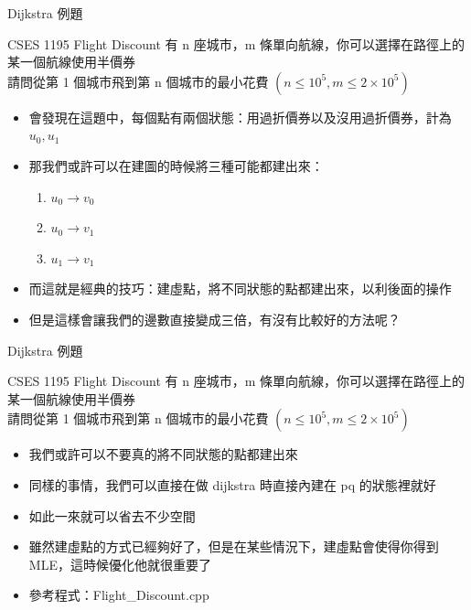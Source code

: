 \documentclass[aspectratio=169]{beamer}
\begin{document}
    \begin{frame}{Dijkstra 例題}
        \begin{block}{CSES 1195 Flight Discount}
            有 n 座城市，m 條單向航線，你可以選擇在路徑上的某一個航線使用半價券\\
            請問從第 1 個城市飛到第 n 個城市的最小花費 $(n \le 10^5, m \le 2 \times 10^5)$
        \end{block}

        \begin{itemize}
            \item<2-> 會發現在這題中，每個點有兩個狀態：用過折價券以及沒用過折價券，計為 $u_0, u_1$
            \item<3-> 那我們或許可以在建圖的時候將三種可能都建出來：
            \begin{enumerate}
                \item $u_0 \rightarrow v_0$
                \item $u_0 \rightarrow v_1$
                \item $u_1 \rightarrow v_1$
            \end{enumerate}
            \item<4-> 而這就是經典的技巧：建虛點，將不同狀態的點都建出來，以利後面的操作
            \item<5-> 但是這樣會讓我們的邊數直接變成三倍，有沒有比較好的方法呢？    
        \end{itemize}                   
    \end{frame}

    \begin{frame}{Dijkstra 例題}
        \begin{block}{CSES 1195 Flight Discount}
            有 n 座城市，m 條單向航線，你可以選擇在路徑上的某一個航線使用半價券\\
            請問從第 1 個城市飛到第 n 個城市的最小花費 $(n \le 10^5, m \le 2 \times 10^5)$
        \end{block}

        \begin{itemize}
            \item<1-> 我們或許可以不要真的將不同狀態的點都建出來
            \item<2-> 同樣的事情，我們可以直接在做 dijkstra 時直接內建在 pq 的狀態裡就好
            \item<3-> 如此一來就可以省去不少空間
            \item<4-> 雖然建虛點的方式已經夠好了，但是在某些情況下，建虛點會使得你得到 MLE，這時候優化他就很重要了
            \item<4-> 參考程式：Flight\_Discount.cpp
        \end{itemize}
    \end{frame}
\end{document}
